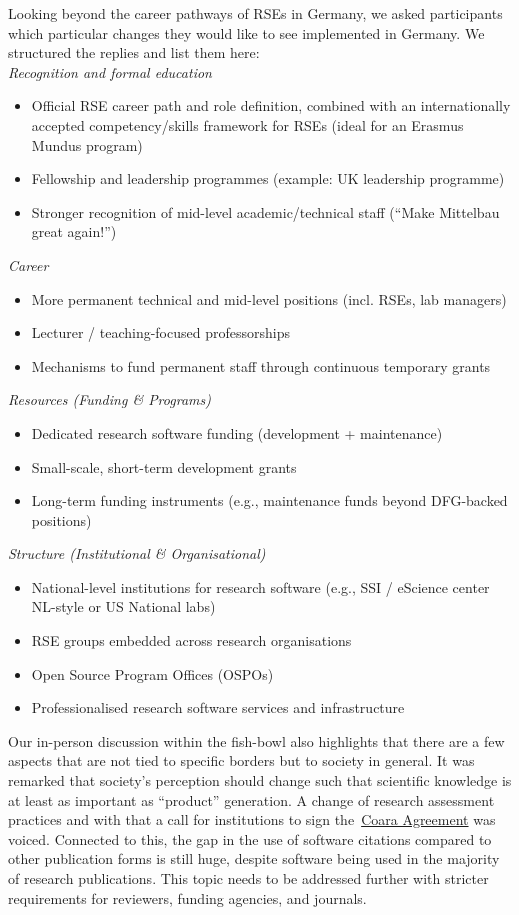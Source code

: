 \documentclass{eceasst}
\begin{document}
Looking beyond the career pathways of RSEs in Germany, we asked participants which particular changes they would like to see implemented in Germany.
We structured the replies and list them here:\\
\emph{Recognition and formal education}
\begin{itemize}
 \item Official RSE career path and role definition, combined with an internationally accepted competency/skills framework for RSEs (ideal for an Erasmus Mundus program)
\item Fellowship and leadership programmes (example: UK leadership programme)
\item Stronger recognition of mid-level academic/technical staff (“Make Mittelbau great again!”)
\end{itemize}
\emph{Career}
\begin{itemize}
 \item More permanent technical and mid-level positions (incl. RSEs, lab managers)
 \item Lecturer / teaching-focused professorships
 \item Mechanisms to fund permanent staff through continuous temporary grants
\end{itemize}
\emph{Resources (Funding \& Programs)}
\begin{itemize}
 \item Dedicated research software funding (development + maintenance)
 \item Small-scale, short-term development grants
 \item Long-term funding instruments (e.g., maintenance funds beyond DFG-backed positions)
\end{itemize}
\emph{Structure (Institutional \& Organisational)}
\begin{itemize}
 \item National-level institutions for research software (e.g., SSI / eScience center NL-style or US National labs)
 \item RSE groups embedded across research organisations
 \item Open Source Program Offices (OSPOs)
 \item Professionalised research software services and infrastructure
\end{itemize}

Our in-person discussion within the fish-bowl also highlights that there are a few aspects that are not tied to specific borders but to society in general.
It was remarked that society's  perception should change such that scientific knowledge is at least as important as \enquote{product} generation.
A change of research assessment practices and with that a call for institutions to sign the~\href{https://www.coara.org/}{Coara Agreement} was voiced.
Connected to this, the gap in the use of software citations compared to other publication forms is still huge, despite software being used in the majority of research publications.
This topic needs to be addressed further with stricter requirements for reviewers, funding agencies, and journals.
\end{document}
